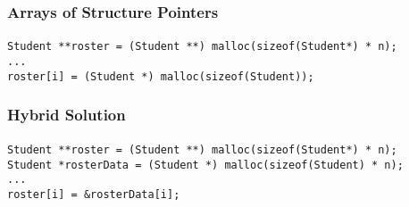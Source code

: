 \documentclass[]{beamer}
\begin{document}
\begin{frame}[fragile]
  \frametitle{Arrays of Structure Pointers}
  \framesubtitle{}

\begin{verbatim}
Student **roster = (Student **) malloc(sizeof(Student*) * n);
...
roster[i] = (Student *) malloc(sizeof(Student));
\end{verbatim}
\begin{center}
\vskip-1.5cm

\end{center}  
  
\end{frame}

\begin{frame}[fragile]
  \frametitle{Hybrid Solution}
  \framesubtitle{}

\begin{verbatim}
Student **roster = (Student **) malloc(sizeof(Student*) * n);
Student *rosterData = (Student *) malloc(sizeof(Student) * n);
...
roster[i] = &rosterData[i];
\end{verbatim}

\vskip-1.0cm

  
\end{frame}
\end{document}
